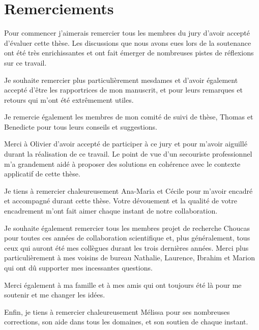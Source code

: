 \section*{Remerciements}

Pour commencer j'aimerais remercier tous les membres du jury d'avoir
accepté d'évaluer cette thèse. Les discussions que nous avons eues
lors de la soutenance ont été très enrichissantes et ont fait émerger
de nombreuses pistes de réflexions sur ce travail.

\vspace{.25cm}

Je souhaite remercier plus particulièrement mesdames
 et  d'avoir également accepté
d'être les rapportrices de mon manuscrit, et pour leurs remarques et
retours qui m'ont été extrêmement utiles.

\vspace{.25cm}

Je remercie également les membres de mon comité de suivi de thèse,
Thomas  et Benedicte  pour tous leurs
conseils et suggestions.

\vspace{.25cm}

Merci à Olivier  d'avoir accepté de participer à ce jury et
pour m'avoir aiguillé durant la réalisation de ce travail. Le point de
vue d'un secouriste professionnel m'a grandement aidé à proposer des
solutions en cohérence avec le contexte applicatif de cette thèse.

\vspace{.25cm}

Je tiens à remercier chaleureusement Ana-Maria 
et Cécile  pour m'avoir encadré et accompagné durant
cette thèse. Votre dévouement et la qualité de votre encadrement m'ont
fait aimer chaque instant de notre collaboration.  

\vspace{.25cm}

Je souhaite également remercier tous les membres projet de recherche
Choucas pour toutes ces années de collaboration scientifique et, plus
généralement, tous ceux qui auront été mes collègues durant les trois
dernières années. Merci plus particulièrement à mes voisins de bureau
Nathalie, Laurence, Ibrahim et Marion qui ont dû supporter mes
incessantes questions.

\vspace{.25cm}

Merci également à ma famille et à mes amis qui ont toujours été là
pour me soutenir et me changer les idées.

\vspace{.25cm}

Enfin, je tiens à remercier chaleureusement Mélissa pour ses
nombreuses corrections, son aide dans tous les domaines, et son
soutien de chaque instant.

